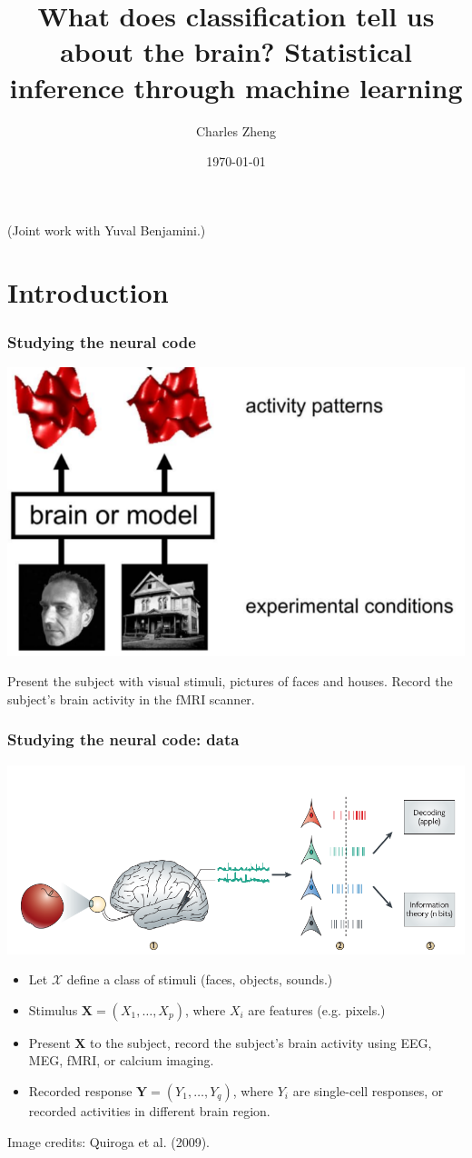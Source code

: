 \documentclass{beamer}
\title[Inference through learning]{What does classification tell us about the brain? Statistical inference through machine learning}
\author{Charles Zheng} %
\institute[Stanford] %
{Stanford University}
\date{\today} %
\newcommand{\bX}{\boldsymbol{X}}
\newcommand{\bY}{\boldsymbol{Y}}
\begin{document}
\begin{frame}
\titlepage %
(Joint work with Yuval Benjamini.)
\end{frame}

\section{Introduction}

\begin{frame}
\frametitle{Studying the neural code}
\begin{center}
\includegraphics[scale = 0.3]{k08_step1.png}
\end{center}
Present the subject with visual stimuli, pictures of faces and houses.
Record the subject's brain activity in the fMRI scanner.
\end{frame}




\begin{frame}
\frametitle{Studying the neural code: data}
\begin{center}
\includegraphics[scale = 0.2]{quiroga.png}
\end{center}
\begin{itemize}
\item  Let $\mathcal{X}$ define a class of stimuli (faces, objects, sounds.)
\item Stimulus $\bX = (X_1,\hdots, X_p)$, where $X_i$ are features (e.g. pixels.)
\item Present $\bX$ to the subject, record the subject's brain activity using EEG, MEG, fMRI, or calcium imaging.
\item Recorded response $\bY = (Y_1,\hdots, Y_q)$, where $Y_i$ are single-cell responses, or recorded activities in different brain region. 
\end{itemize}
\tiny{Image credits: Quiroga et al. (2009).}
\end{frame}
\end{document}

